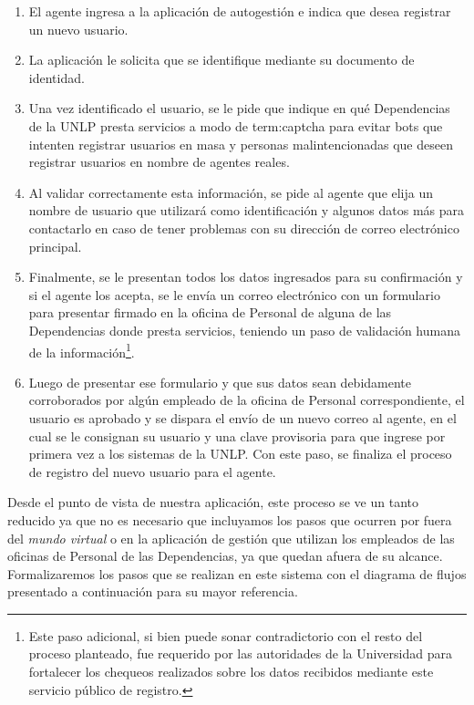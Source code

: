 \begin{enumerate}
  \item El agente ingresa a la aplicación de autogestión e indica que desea registrar un nuevo usuario.

  \item La aplicación le solicita que se identifique mediante su documento de identidad.

  \item Una vez identificado el usuario, se le pide que indique en qué Dependencias de la UNLP presta servicios a modo de \gls{term:captcha} para evitar bots que intenten registrar usuarios en masa y personas malintencionadas que deseen registrar usuarios en nombre de agentes reales.

  \item Al validar correctamente esta información, se pide al agente que elija un nombre de usuario que utilizará como identificación y algunos datos más para contactarlo en caso de tener problemas con su dirección de correo electrónico principal.

  \item Finalmente, se le presentan todos los datos ingresados para su confirmación y si el agente los acepta, se le envía un correo electrónico con un formulario para presentar firmado en la oficina de Personal de alguna de las Dependencias donde presta servicios, teniendo un paso de validación humana de la información\footnote{Este paso adicional, si bien puede sonar contradictorio con el resto del proceso  planteado, fue requerido por las autoridades de la Universidad para fortalecer los chequeos realizados sobre los datos recibidos mediante este servicio público de registro.}.

  \item Luego de presentar ese formulario y que sus datos sean debidamente corroborados por algún empleado de la oficina de Personal correspondiente, el usuario es aprobado y se dispara el envío de un nuevo correo al agente, en el cual se le consignan su usuario y una clave provisoria para que ingrese por primera vez a los sistemas de la UNLP. Con este paso, se finaliza el proceso de registro del nuevo usuario para el agente.
\end{enumerate}

Desde el punto de vista de nuestra aplicación, este proceso se ve un tanto reducido ya que no es necesario que incluyamos los pasos que ocurren por fuera del \textit{mundo virtual} o en la aplicación de gestión que utilizan los empleados de las oficinas de Personal de las Dependencias, ya que quedan afuera de su alcance. Formalizaremos los pasos que se realizan en este sistema con el diagrama de flujos presentado a continuación para su mayor referencia.

